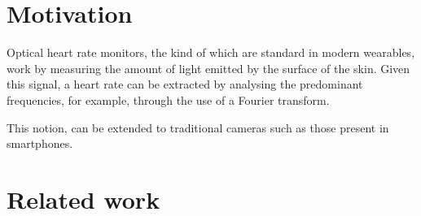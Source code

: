\section{Motivation}
Optical heart rate monitors, the kind of which are standard in modern wearables,
work by measuring the amount of light emitted by the surface of the skin.
Given this signal, a heart rate can be extracted by analysing the predominant frequencies, for example, through the use
of a Fourier transform.

\par
This notion, can be extended to traditional cameras such as those present in smartphones.

\section{Related work}
